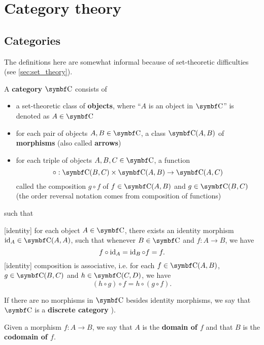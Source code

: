 \section{Category theory}\label{sec:category_theory}
\subsection{Categories}\label{subsec:categories}

\begin{remark}
  The definitions here are somewhat informal because of set-theoretic difficulties (see \cref{sec:set_theory}).
\end{remark}

\begin{definition}\label{def:category}\cite[definition 1.1.1]{Leinster2014}
  A \textbf{category} \( \Bold C \) consists of
  \begin{itemize}
    \item a set-theoretic class of \textbf{objects}, where \enquote{\( A \) is an object in \( \Bold C \)} is denoted as \( A \in \Bold C \)
    \item for each pair of objects \( A, B \in \Bold C \), a class \( {\Bold C}(A, B) \) of \textbf{morphisms} (also called \textbf{arrows})
    \item for each triple of objects \( A, B, C \in \Bold C \), a function
    \begin{equation*}
      \circ: {\Bold C}(B, C) \times {\Bold C}(A, B) \to {\Bold C}(A, C)
    \end{equation*}
    called the composition \( g \circ f \) of \( f \in {\Bold C}(A, B) \) and \( g \in {\Bold C}(B, C) \) (the order reversal notation comes from composition of functions)
  \end{itemize}
  such that
  \begin{description}
    [identity] for each object \( A \in \Bold C \), there exists an identity morphism \( \Id_A \in {\Bold C}(A, A) \), such that whenever \( B \in \Bold{C} \) and \( f: A \to B \), we have
    \begin{equation*}
      f \circ \operatorname{id}_A = \operatorname{id}_B \circ f = f.
    \end{equation*}
    [identity] composition is associative, i.e. for each \( f \in {\Bold C}(A, B) \), \( g \in {\Bold C}(B, C) \) and \( h \in {\Bold C}(C, D) \), we have
    \begin{equation*}
      (h \circ g) \circ f = h \circ (g \circ f).
    \end{equation*}
  \end{description}

  If there are no morphisms in \( \Bold C \) besides identity morphisms, we say that \( \Bold C \) is a \textbf{discrete category} \cite[example 1.1.18(b]{Leinster2014}).

  Given a morphism \( f: A \to B \), we say that \( A \) is the \textbf{domain of \( f \)} and that \( B \) is the \textbf{codomain of \( f \)}.
\end{definition}

